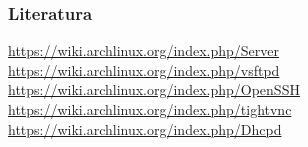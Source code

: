 \documentclass[t,table,usenames,dvipsnames]{beamer}
\begin{document}
\begin{frame}
	\frametitle{Literatura}
	\url{https://wiki.archlinux.org/index.php/Server}
	\vfill
	\url{https://wiki.archlinux.org/index.php/vsftpd}\\
	\url{https://wiki.archlinux.org/index.php/OpenSSH}\\
	\url{https://wiki.archlinux.org/index.php/tightvnc}\\
	\url{https://wiki.archlinux.org/index.php/Dhcpd}
\end{frame}
\end{document}

